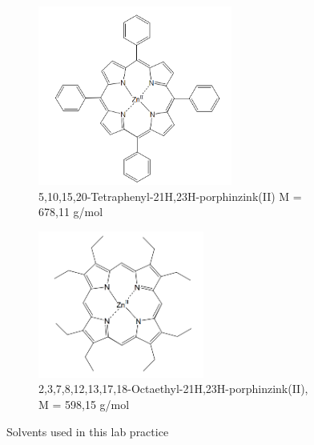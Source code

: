 \begin{figure}[h]
    \centering
    \begin{subfigure}[b]{0.5\textwidth}
        \centering
        \includegraphics[width =0.7\textwidth]{Bilder/Grundlagen/ZnTPP.png}      
        \caption{5,10,15,20-Tetraphenyl-21H,23H-porphinzink(II) \newline M = 678,11 g/mol}
      \label{fig:BN}
    \end{subfigure}
    \hspace{\fill}
    \begin{subfigure}[b]{0.3\textwidth}
      \centering
      \includegraphics[width = 0.6\textwidth]{Bilder/Grundlagen/ZnOEP.png}      
      \caption{2,3,7,8,12,13,17,18-Octaethyl-21H,23H-porphinzink(II), M = 598,15 g/mol}
      \label{fig:Tol}
    \end{subfigure}
    \caption{Solvents used in this lab practice}
    \label{fig:Solvents}
\end{figure}
